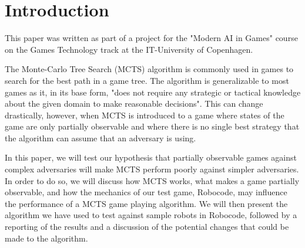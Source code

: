 \section{Introduction}
\label{01}
This paper was written as part of a project for the "Modern AI in Games" course on the Games Technology track at the IT-University of Copenhagen.

The Monte-Carlo Tree Search (MCTS) algorithm is commonly used in games to search for the best path in a game tree. The algorithm is generalizable to most games as it, in its base form, "does not require any strategic or tactical knowledge about the given domain to make reasonable decisions"\cite{mctsai}. This can change drastically, however, when MCTS is introduced to a game where states of the game are only partially observable and where there is no single best strategy that the algorithm can assume that an adversary is using. 

In this paper, we will test our hypothesis that partially observable games against complex adversaries will make MCTS perform poorly against simpler adversaries. In order to do so, we will discuss how MCTS works, what makes a game partially observable, and how the mechanics of our test game, Robocode, may influence the performance of a MCTS game playing algorithm. We will then present the algorithm we have used to test against sample robots in Robocode, followed by a reporting of the results and a discussion of the potential changes that could be made to the algorithm.